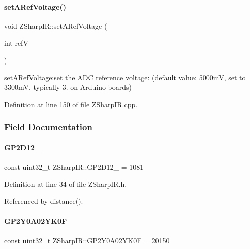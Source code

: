 \paragraph{\texorpdfstring{set\+A\+Ref\+Voltage()}{setARefVoltage()}}
{\footnotesize\ttfamily void Z\+Sharp\+I\+R\+::set\+A\+Ref\+Voltage (\begin{DoxyParamCaption}\item[{int}]{refV }\end{DoxyParamCaption})}



set\+A\+Ref\+Voltage\+:set the A\+DC reference voltage\+: (default value\+: 5000mV, set to 3300mV, typically 3. on Arduino boards) 



Definition at line 150 of file Z\+Sharp\+I\+R.\+cpp.



\subsubsection{Field Documentation}
\mbox{\label{class_z_sharp_i_r_aa57ecb5df655ad5db0bd56e7bae59862}} 
\paragraph{\texorpdfstring{G\+P2\+D12\+\_}{GP2D12\_24}}
{\footnotesize\ttfamily const uint32\+\_\+t Z\+Sharp\+I\+R\+::\+G\+P2\+D12\+\_ = 1081\hspace{0.3cm}{\ttfamily [static]}}



Definition at line 34 of file Z\+Sharp\+I\+R.\+h.



Referenced by distance().

\mbox{\label{class_z_sharp_i_r_a588056203604897b782c2ac771cd2536}} 
\paragraph{\texorpdfstring{G\+P2\+Y0\+A02\+Y\+K0F}{GP2Y0A02YK0F}}
{\footnotesize\ttfamily const uint32\+\_\+t Z\+Sharp\+I\+R\+::\+G\+P2\+Y0\+A02\+Y\+K0F = 20150\hspace{0.3cm}{\ttfamily [static]}}



